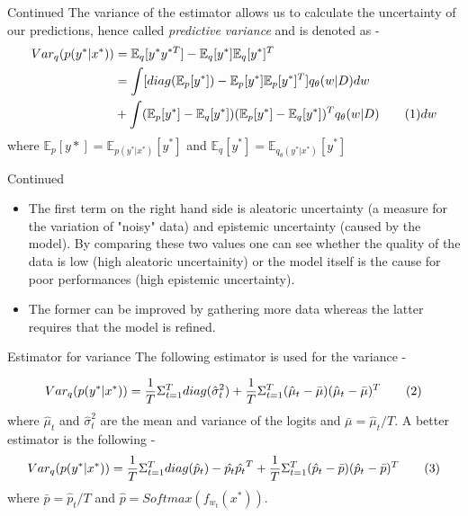 \documentclass{beamer}
\theoremstyle{remark}
\newcommand\numberthis{\addtocounter{equation}{1}\tag{\theequation}}
\begin{document}
\begin{frame}{Continued}
    The variance of the estimator allows us to calculate the uncertainty of our predictions, hence called \emph{predictive variance} and is denoted as -
    \begin{align*}
        Var_q(p(y^*|x^*)) &= \mathbb{E}_q[y^* y^{*T}] - \mathbb{E}_q[y^*]\mathbb{E}_q[y^*]^T \\
        &= \int [diag(\mathbb{E}_p[y^*])-\mathbb{E}_p[y^*]\mathbb{E}_p[y^*]^T] q_\theta (w|D) dw \\
        &+ \int (\mathbb{E}_p[y^*]-\mathbb{E}_q[y^*]) (\mathbb{E}_p[y^*]-\mathbb{E}_q[y^*])^T q_\theta(w|D) \numberthis{\label{eq8}}dw
    \end{align*}
    where $\mathbb{E}_p[y*]=\mathbb{E}_{p(y^*|x^*)}[y^*]$ and $\mathbb{E}_q[y^*]=\mathbb{E}_{q_\theta (y^*|x^*)}[y^*]$
\end{frame}
\begin{frame}{Continued}
    \begin{itemize}
        \item The first term on the right hand side is aleatoric uncertainty (a measure for the variation of "noisy" data) and epistemic uncertainty (caused by the model). By comparing these two values one can see whether the quality of the data is low (high aleatoric uncertainity) or the model itself is the cause for poor performances (high epistemic uncertainty).
        \item The former can be improved by gathering more data whereas the latter requires that the model is refined.
    \end{itemize}
\end{frame}
\begin{frame}{Estimator for variance}
The following estimator is used for the variance - 

\begin{align*}
    Var_q (p(y^*|x^*))  = \frac{1}{T} \Sigma_{t=1}^T diag(\hat{\sigma}_t^2) + \frac{1}{T} \Sigma_{t=1}^T (\hat{\mu}_t-\bar{\mu}) (\hat{\mu}_t-\bar{\mu})^T \numberthis{\label{eq9}}
\end{align*}
where $\hat{\mu}_t$ and $\hat{\sigma}_t^2$ are the mean and variance of the logits and $\bar{\mu} = \hat{\mu}_t/T$.
A better estimator is the following - 
    \begin{align*}
    Var_q (p(y^*|x^*))  = \frac{1}{T} \Sigma_{t=1}^T diag(\hat{p}_t)-\hat{p_t}\hat{p_t}^T + \frac{1}{T} \Sigma_{t=1}^T (\hat{p}_t-\bar{p}) (\hat{p}_t-\bar{p})^T \numberthis{\label{eq10}}
\end{align*}
where $\bar{p} = \hat{p}_t/T$ and $\hat{p}=Softmax(f_{w_t}(x^*))$.
\end{frame}
\end{document}
